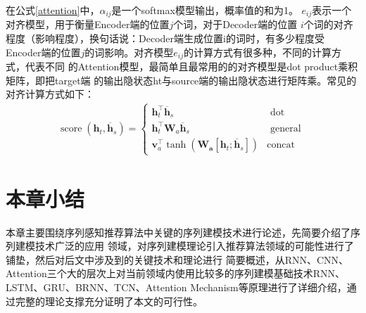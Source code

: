 在公式\eqref{attention}中，$\alpha_{ij}$是一个softmax模型输出，概率值的和为1。%
$e_{ij}$表示一个对齐模型，用于衡量Encoder端的位置$j$个词，对于Decoder端的位置%
$i$个词的对齐程度（影响程度），换句话说：Decoder端生成位置i的词时，有多少程度受%
Encoder端的位置$j$的词影响。对齐模型$e_{ij}$的计算方式有很多种，不同的计算方式，代表不同%
的Attention模型，最简单且最常用的的对齐模型是dot product乘积矩阵，即把target端%
的输出隐状态ht与source端的输出隐状态进行矩阵乘。常见的对齐计算方式如下：
\begin{align}
\operatorname{score}\left(\boldsymbol{h}_{t}, \overline{\boldsymbol{h}}_{s}\right)=
\left\{
  \begin{array}{ll}{\boldsymbol{h}_{t}^{\top} \overline{\boldsymbol{h}}_{s}} & {\text { dot }} \\ {\boldsymbol{h}_{t}^{\top} \boldsymbol{W}_{a} \overline{\boldsymbol{h}}_{s}} & {\text { general }} \\ {\boldsymbol{v}_{a}^{\top} \tanh \left(\boldsymbol{W}_{\boldsymbol{a}}\left[\boldsymbol{h}_{t} ; \overline{\boldsymbol{h}}_{s}\right]\right)} & {\text {concat}}
  \end{array}
\right.
\end{align} 

\section{本章小结}

本章主要围绕序列感知推荐算法中关键的序列建模技术进行论述，先简要介绍了序列建模技术广泛的应用%
领域，对序列建模理论引入推荐算法领域的可能性进行了铺垫，然后对后文中涉及到的关键技术和理论进行%
简要概述，从RNN、CNN、Attention三个大的层次上对当前领域内使用比较多的序列建模基础技术RNN、LSTM、GRU、BRNN、TCN、Attention Mechanism等原理进行了详细介绍，通过完整的理论支撑充分证明了本文的可行性。
